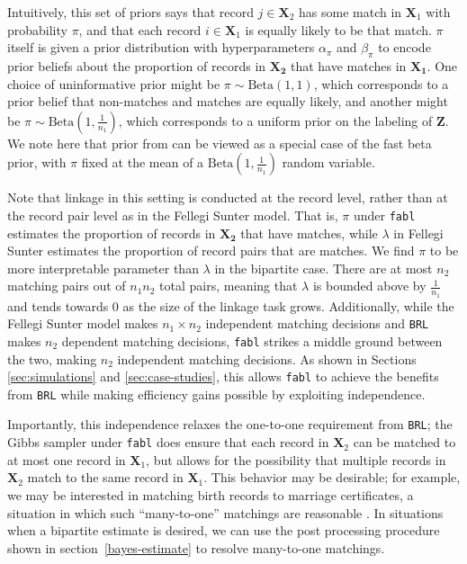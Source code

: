 \documentclass[ba]{imsart}
\begin{document}
Intuitively, this set of priors says that record $j \in \bm{X}_2$ has some match in $\bm{X}_1$ with probability $\pi$, and that each record $i \in \bm{X}_1$ is equally likely to be that match. $\pi$ itself is given a prior distribution with hyperparameters $\alpha_{\pi}$ and $\beta_{\pi}$ to encode prior beliefs about  the proportion of records in $\bm{X_2}$ that have matches in $\bm{X_1}$. One choice of uninformative prior might be \(\pi \sim \text{Beta}(1, 1)\), which corresponds to a prior belief that non-matches and matches are equally likely, and another might be \(\pi \sim \text{Beta}\left(1, \frac{1}{n_1}\right)\), which corresponds to a uniform prior on the labeling of \(\bm{Z}\). We note here that prior from \cite{heck2019} can be viewed as a special case of the fast beta prior, with $\pi$ fixed at the mean of a $\text{Beta}\left(1, \frac{1}{n_1}\right)$ random variable. 

Note that linkage in this setting is conducted at the record level, rather than at the record pair level as in the Fellegi Sunter model. That is, $\pi$ under \texttt{fabl} estimates the proportion of records in $\bm{X_2}$ that have matches, while $\lambda$ in Fellegi Sunter estimates the proportion of record pairs that are matches. We find $\pi$ to be more interpretable parameter than $\lambda$ in the bipartite case. There are at most $n_2$ matching pairs out of $n_1 n_2$ total pairs, meaning that $\lambda$ is bounded above by $\frac{1}{n_1}$ and tends towards 0 as the size of the linkage task grows. Additionally, while the Fellegi Sunter model makes $n_1 \times n_2$ independent matching decisions and \texttt{BRL} makes $n_2$ dependent matching decisions, \texttt{fabl} strikes a middle ground between the two, making $n_2$  independent matching decisions. As shown in Sections \ref{sec:simulations} and \ref{sec:case-studies}, this allows \texttt{fabl} to achieve the benefits from \texttt{BRL} while making efficiency gains possible by exploiting independence. 

Importantly, this independence relaxes the one-to-one requirement from \texttt{BRL}; the Gibbs sampler under \texttt{fabl} does ensure that each record in \(\bm{X}_2\) can be matched to at most one record in \(\bm{X}_1\), but allows for the possibility that multiple records in \(\bm{X}_2\) match to the same record in \(\bm{X}_1\). This behavior may be desirable; for example, we may be interested in matching birth records to marriage certificates, a situation in which such ``many-to-one'' matchings are reasonable \citep{Newcombe1963}. In situations when a bipartite estimate is desired, we can use the post processing procedure shown in section~\ref{bayes-estimate} to resolve many-to-one matchings.  
\end{document}
